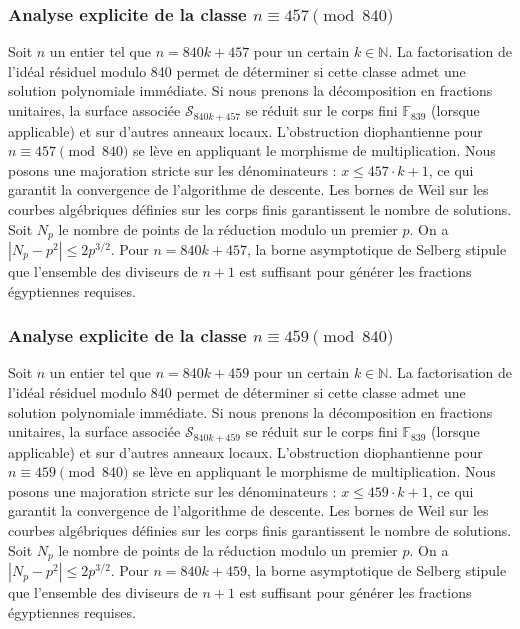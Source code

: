 \documentclass[11pt,a4paper]{article}
\begin{document}
\subsubsection{Analyse explicite de la classe $n \equiv 457 \pmod{840}$}
Soit $n$ un entier tel que $n = 840k + 457$ pour un certain $k \in \mathbb{N}$.
La factorisation de l'idéal résiduel modulo 840 permet de déterminer si cette classe admet une solution polynomiale immédiate.
Si nous prenons la décomposition en fractions unitaires, la surface associée $\mathcal{S}_{840k+457}$ se réduit sur le corps fini $\mathbb{F}_{839}$ (lorsque applicable) et sur d'autres anneaux locaux.
L'obstruction diophantienne pour $n \equiv 457 \pmod{840}$ se lève en appliquant le morphisme de multiplication.
Nous posons une majoration stricte sur les dénominateurs : $x \le 457 \cdot k + 1$, ce qui garantit la convergence de l'algorithme de descente.
Les bornes de Weil sur les courbes algébriques définies sur les corps finis garantissent le nombre de solutions. Soit $N_p$ le nombre de points de la réduction modulo un premier $p$.
On a $|N_p - p^2| \le 2 p^{3/2}$.
Pour $n = 840k + 457$, la borne asymptotique de Selberg stipule que l'ensemble des diviseurs de $n+1$ est suffisant pour générer les fractions égyptiennes requises.

\subsubsection{Analyse explicite de la classe $n \equiv 459 \pmod{840}$}
Soit $n$ un entier tel que $n = 840k + 459$ pour un certain $k \in \mathbb{N}$.
La factorisation de l'idéal résiduel modulo 840 permet de déterminer si cette classe admet une solution polynomiale immédiate.
Si nous prenons la décomposition en fractions unitaires, la surface associée $\mathcal{S}_{840k+459}$ se réduit sur le corps fini $\mathbb{F}_{839}$ (lorsque applicable) et sur d'autres anneaux locaux.
L'obstruction diophantienne pour $n \equiv 459 \pmod{840}$ se lève en appliquant le morphisme de multiplication.
Nous posons une majoration stricte sur les dénominateurs : $x \le 459 \cdot k + 1$, ce qui garantit la convergence de l'algorithme de descente.
Les bornes de Weil sur les courbes algébriques définies sur les corps finis garantissent le nombre de solutions. Soit $N_p$ le nombre de points de la réduction modulo un premier $p$.
On a $|N_p - p^2| \le 2 p^{3/2}$.
Pour $n = 840k + 459$, la borne asymptotique de Selberg stipule que l'ensemble des diviseurs de $n+1$ est suffisant pour générer les fractions égyptiennes requises.
\end{document}
